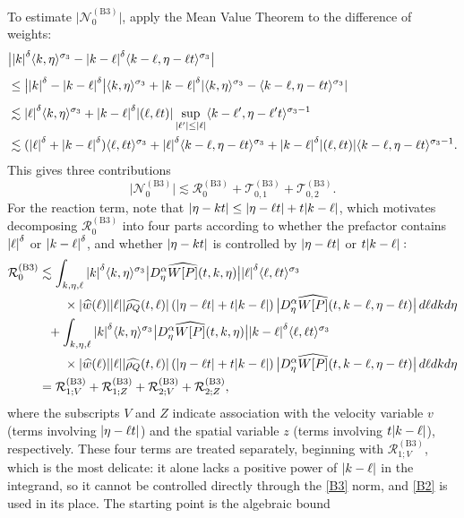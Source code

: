 \documentclass[JEP,XML,SOM,Unicode]{cedram}
\newcommand{\babs}[1]{\bigl|#1\bigr|}
\theoremstyle{plain}
\theoremstyle{remark}
\newcommand{\br}[1]{\left(#1\right)}
\newcommand{\ak}{\abs{k}}
\newcommand{\jb}[1]{\langle#1\rangle}
\begin{document}
To estimate $\babs{\mathcal{N}_0^{\mathrm{(B3)}}}$, apply the Mean Value Theorem to the difference of weights:
\begin{align*}
&\babs{\abs{k}^\delta\jb{k,\eta}^{\sigma_3}-\abs{k-\ell }^\delta\jb{k-\ell ,\eta-\ell t}^{\sigma_3}}\\
&\leq \babs{\ak^\delta-\abs{k-\ell }^\delta}\jb{k,\eta}^{\sigma_3}+\abs{k-\ell }^\delta\abs{\jb{k,\eta}^{\sigma_3}-\jb{k-\ell ,\eta-\ell t}^{\sigma_3}}\vphantom{\int}\\
&\lesssim\abs{\ell }^\delta\jb{k,\eta}^{\sigma_3}+\abs{k-\ell }^\delta\abs{(\ell ,\ell t)}\sup_{\abs{\ell '}\leq \abs{\ell }}\jb{k-\ell ',\eta-\ell 't}^{\sigma_3-1}\\
&\lesssim(\abs{\ell }^\delta+\abs{k-\ell }^\delta)\jb{\ell ,\ell t}^{\sigma_3}+\abs{\ell }^\delta\jb{k-\ell ,\eta-\ell t}^{\sigma_3}+\abs{k-\ell }^\delta\abs{(\ell ,\ell t)}\jb{k-\ell ,\eta-\ell t}^{\sigma_3-1}.
\end{align*}
This gives three contributions \[\babs{\mathcal{N}_0^{\mathrm{(B3)}}}\lesssim \mathcal{R}_0^{\mathrm{(B3)}}+\mathcal{T}_{0,1}^{\mathrm{(B3)}}+\mathcal{T}_{0,2}^{\mathrm{(B3)}}.\] For the reaction term, note that $\abs{\eta-kt}\leq \abs{\eta-\ell t}+t\abs{k-\ell }$, which motivates decomposing $\mathcal{R}_0^{\mathrm{(B3)}}$ into four parts according to whether the prefactor contains $\abs{\ell}^\delta$ or $\abs{k-\ell}^{\delta}$, and whether $\abs{\eta-kt}$ is controlled by $\abs{\eta-\ell t}$ or $t\abs{k-\ell}:$
\begin{align*}
\mathcal{R}_0^{\mathrm{(B3)}}&\lesssim\int_{k,\eta,\ell }\abs{k}^\delta\jb{k,\eta}^{\sigma_3}\babs{D_\eta^\alpha \widehat{W[P]}(t,k,\eta)}\abs{\ell }^\delta\jb{\ell ,\ell t}^{\sigma_3}\\
&\hspace{0.7cm}\times\abs{\widehat{w}(\ell )}\abs{\ell }\abs{\widehat{\rho_Q}(t,\ell )}\br{\abs{\eta-\ell t}+t\abs{k-\ell }}\babs{D_\eta^\alpha\widehat{W[P]}(t,k-\ell ,\eta-\ell t)}\,d\ell dkd\eta\\
&\hspace{0.25cm}+\int_{k,\eta,\ell }\abs{k}^\delta\jb{k,\eta}^{\sigma_3}\babs{D_\eta^\alpha \widehat{W[P]}(t,k,\eta)}\abs{k-\ell }^\delta\jb{\ell ,\ell t}^{\sigma_3}\\
&\hspace{0.7cm}\times\abs{\widehat{w}(\ell )}\abs{\ell }\abs{\widehat{\rho_Q}(t,\ell )}\br{\abs{\eta-\ell t}+t\abs{k-\ell }}\babs{D_\eta^\alpha\widehat{W[P]}(t,k-\ell ,\eta-\ell t)}\,d\ell dkd\eta\\
&=\mathcal{R}_{1;V}^{\mathrm{(B3)}}+\mathcal{R}_{1;Z}^{\mathrm{(B3)}}+\mathcal{R}_{2;V}^{\mathrm{(B3)}}+\mathcal{R}_{2;Z}^{\mathrm{(B3)}},
\end{align*}where the subscripts $V$ and $Z$ indicate association with the velocity variable $v$ (terms involving $\abs{\eta-\ell t}$) and the spatial variable $z$ (terms involving $t\abs{k-\ell}$), respectively. These four terms are treated separately, beginning with $\mathcal{R}_{1;V}^{\mathrm{(B3)}}$, which is the most delicate: it alone lacks a positive power of $\abs{k-\ell}$ in the integrand, so it cannot be controlled directly through the \eqref{B3} norm, and \eqref{B2} is used in its place. The starting point is the algebraic bound
\end{document}
